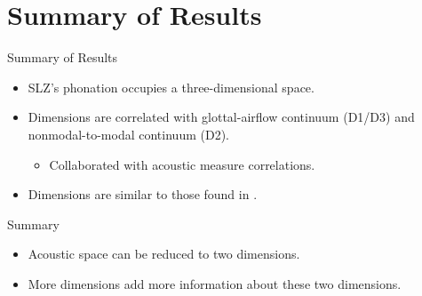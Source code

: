 \documentclass{beamer}
\begin{document}


\section*{Summary of Results}
\begin{frame}{Summary of Results}
  \begin{itemize}
    \item SLZ's phonation occupies a three-dimensional space.
    \item Dimensions are correlated with glottal-airflow continuum (D1/D3) and nonmodal-to-modal continuum (D2).
    \begin{itemize}
      \item Collaborated with acoustic measure correlations.
    \end{itemize}
    \item Dimensions are similar to those found in \citeauthor{keatingCrosslanguageAcousticSpace2023}.
  \end{itemize}
\end{frame}

\begin{frame}{Summary}
  \begin{itemize}
    \item Acoustic space can be reduced to two dimensions.
    \item More dimensions add more information about these two dimensions.
  \end{itemize}
  \begin{figure}[h!]
    \centering
\end{figure}
\end{frame}
\end{document}
